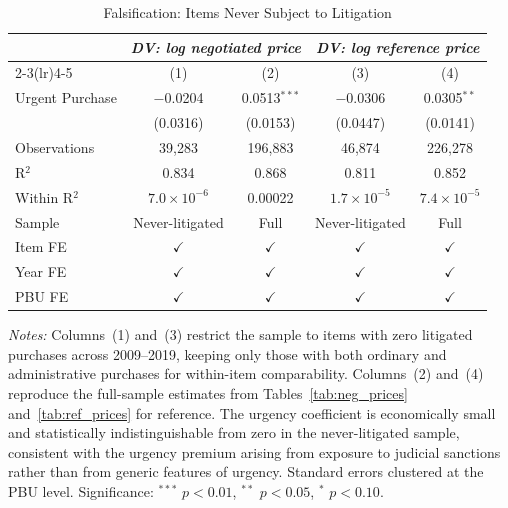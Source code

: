 \begin{table}[ht]
  \centering
  \caption{Falsification: Items Never Subject to Litigation}
  \label{tab:placebo}
  \small
  \begin{threeparttable}
  \begin{tabular}{lcccc}
    \toprule
    & \multicolumn{2}{c}{\textit{DV: log negotiated price}}
    & \multicolumn{2}{c}{\textit{DV: log reference price}} \\
    \cmidrule(lr){2-3}\cmidrule(lr){4-5}
                           & (1)                      & (2)            & (3)                      & (4)           \\
    \midrule
    Urgent Purchase        & $-$0.0204                & 0.0513$^{***}$ & $-$0.0306                & 0.0305$^{**}$ \\
                           & (0.0316)                 & (0.0153)       & (0.0447)                 & (0.0141)      \\[3pt]
    \midrule
    Observations           & 39{,}283                 & 196{,}883      & 46{,}874                 & 226{,}278     \\
    R$^2$                  & 0.834                    & 0.868          & 0.811                    & 0.852         \\
    Within R$^2$           & $7.0\!\times\!10^{-6}$   & 0.00022        & $1.7\!\times\!10^{-5}$   & $7.4\!\times\!10^{-5}$ \\
    \midrule
    Sample                 & Never-litigated          & Full           & Never-litigated          & Full          \\
    Item FE                & $\checkmark$             & $\checkmark$   & $\checkmark$             & $\checkmark$  \\
    Year FE                & $\checkmark$             & $\checkmark$   & $\checkmark$             & $\checkmark$  \\
    PBU FE                 & $\checkmark$             & $\checkmark$   & $\checkmark$             & $\checkmark$  \\
    \bottomrule
  \end{tabular}
  \begin{tablenotes}
    \small
    \item \textit{Notes:} Columns~(1) and~(3) restrict the sample to items
    with zero litigated purchases across 2009--2019, keeping only those
    with both ordinary and administrative purchases for within-item
    comparability. Columns~(2) and~(4) reproduce the full-sample estimates
    from Tables~\ref{tab:neg_prices} and~\ref{tab:ref_prices} for reference.
    The urgency coefficient is economically small and statistically
    indistinguishable from zero in the never-litigated sample, consistent
    with the urgency premium arising from exposure to judicial sanctions
    rather than from generic features of urgency. Standard errors
    clustered at the PBU level. Significance: $^{***}$ $p<0.01$,
    $^{**}$ $p<0.05$, $^{*}$ $p<0.10$.
  \end{tablenotes}
  \end{threeparttable}
\end{table}

